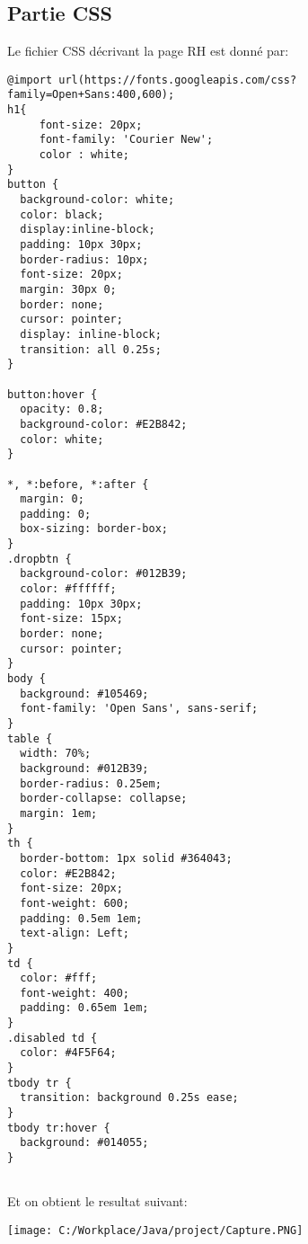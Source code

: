 \documentclass[12]{article}
\begin{document}
\subsection{Partie CSS}
Le fichier CSS décrivant la page RH est donné par:
\lstset{language=java}
\begin{lstlisting}
@import url(https://fonts.googleapis.com/css?family=Open+Sans:400,600);
h1{
	 font-size: 20px;
	 font-family: 'Courier New';
	 color : white;
}
button {
  background-color: white;
  color: black;
  display:inline-block;
  padding: 10px 30px;
  border-radius: 10px;
  font-size: 20px;
  margin: 30px 0;
  border: none;
  cursor: pointer;
  display: inline-block;
  transition: all 0.25s;
}

button:hover {
  opacity: 0.8;
  background-color: #E2B842;
  color: white;
}

*, *:before, *:after {
  margin: 0;
  padding: 0;
  box-sizing: border-box;
}
.dropbtn {
  background-color: #012B39;
  color: #ffffff;
  padding: 10px 30px;
  font-size: 15px;
  border: none;
  cursor: pointer;
}
body {
  background: #105469;
  font-family: 'Open Sans', sans-serif;
}
table {
  width: 70%;
  background: #012B39;
  border-radius: 0.25em;
  border-collapse: collapse;
  margin: 1em;
}
th {
  border-bottom: 1px solid #364043;
  color: #E2B842;
  font-size: 20px;
  font-weight: 600;
  padding: 0.5em 1em;
  text-align: Left;
}
td {
  color: #fff;
  font-weight: 400;
  padding: 0.65em 1em;
}
.disabled td {
  color: #4F5F64;
}
tbody tr {
  transition: background 0.25s ease;
}
tbody tr:hover {
  background: #014055;
}


\end{lstlisting}

 Et on obtient le resultat suivant:

\begin{center}
\texttt{[image: C:/Workplace/Java/project/Capture.PNG]}
\end{center}
\end{document}
